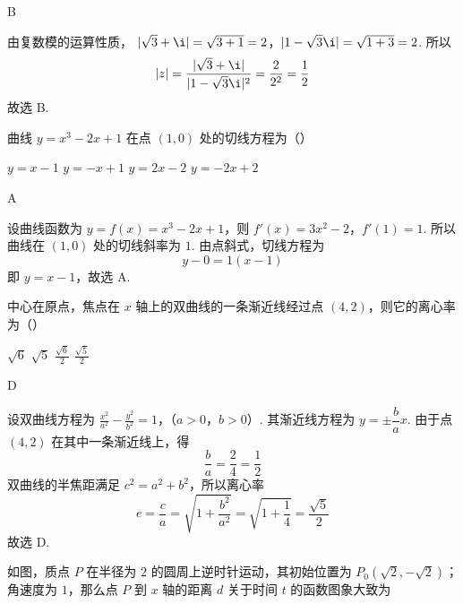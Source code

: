 \begin{answer}
B
\end{answer}

\begin{solution}
由复数模的运算性质，
\(|\sqrt{3}+\i|=\sqrt{3+1}=2\)，\(|1-\sqrt{3}\i|=\sqrt{1+3}=2\).
所以
\[
|z|=\frac{|\sqrt{3}+\i|}{|1-\sqrt{3}\i|^{2}}=\frac{2}{2^{2}}=\frac{1}{2}
\]
故选 B.
\end{solution}

\begin{problem}
曲线 \( y = x^3 - 2x + 1 \) 在点 \((1,0)\) 处的切线方程为（\quad）

\choices
    {\(y = x - 1\)}
    {\( y = -x + 1 \)}
    {\(y = 2x - 2\)}
    {\(y = -2x + 2\)}
\end{problem}

\begin{answer}
A
\end{answer}

\begin{solution}
设曲线函数为 \(y=f(x)=x^{3}-2x+1\)，则
\(f'(x)=3x^{2}-2\)，\(f'(1)=1\).
所以曲线在 \((1,0)\) 处的切线斜率为 \(1\). 由点斜式，切线方程为
\[
y-0=1(x-1)
\]
即 \(y=x-1\)，故选 A.
\end{solution}

\begin{problem}
中心在原点，焦点在 \(x\) 轴上的双曲线的一条渐近线经过点 \((4,2)\)，则它的离心率为（\quad）

\choices
    {\(\sqrt{6}\)}
    {\(\sqrt{5}\)}
    {\(\frac{\sqrt{6}}{2}\)}
    {\(\frac{\sqrt{5}}{2}\)}
\end{problem}

\begin{answer}
D
\end{answer}

\begin{solution}
设双曲线方程为
\(\frac{x^{2}}{a^{2}}-\frac{y^{2}}{b^{2}}=1\)，（\(a>0\)，\(b>0\)）.
其渐近线方程为 \(y=\pm\dfrac{b}{a}x\). 由于点 \((4,2)\) 在其中一条渐近线上，得
\[
\frac{b}{a}=\frac{2}{4}=\frac{1}{2}
\]
双曲线的半焦距满足 \(c^{2}=a^{2}+b^{2}\)，所以离心率
\[
e=\frac{c}{a}=\sqrt{1+\frac{b^{2}}{a^{2}}}=\sqrt{1+\frac14}=\frac{\sqrt{5}}{2}
\]
故选 D.
\end{solution}

\begin{problem}
如图，质点 \(P\) 在半径为 \(2\) 的圆周上逆时针运动，其初始位置为 \(P_{0}(\sqrt{2}, -\sqrt{2})\)；角速度为 \(1\)，那么点 \(P\) 到 \(x\) 轴的距离 \(d\) 关于时间 \(t\) 的函数图象大致为

    {}
    {}
    {}
\end{problem}

